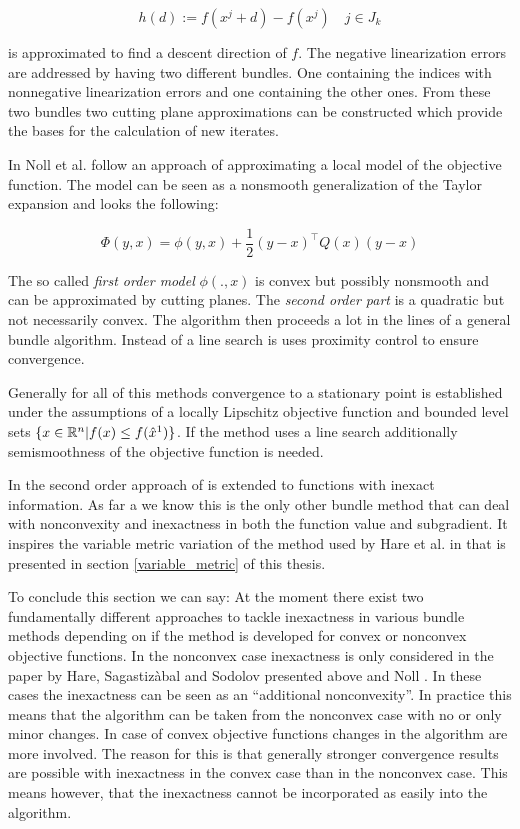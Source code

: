 \begin{equation}
	h(d):= f(x^j +d) -f(x^j) \quad j \in J_k
\label{diff_fun}
\end{equation}

is approximated to find a descent direction of \(f\).
The negative linearization errors are addressed by having two different bundles. One containing the indices with nonnegative linearization errors and one containing the other ones. From these two bundles two cutting plane approximations can be constructed which provide the bases for the calculation of new iterates.

In \cite{Noll2012} Noll et al. follow an approach of approximating a local model of the objective function. The model can be seen as a nonsmooth generalization of the Taylor expansion and looks the following:

\begin{equation}
	\Phi(y,x) = \phi(y,x)+\frac{1}{2}(y-x)^{\top}Q(x)(y-x)
\label{quad_mod}
\end{equation}

The so called \emph{first order model} \(\phi(.,x)\) is convex but possibly nonsmooth and can be approximated by cutting planes. The \emph{second order part} is a quadratic but not necessarily convex. The algorithm then proceeds a lot in the lines of a general bundle algorithm.
Instead of a line search is uses proximity control to ensure convergence.

Generally for all of this methods convergence to a stationary point is established under the assumptions of a locally Lipschitz objective function and bounded level sets \(\{x \in \mathbb{R}^n | f(x) \leq f(\hat{x}^1)\}\).
If the method uses a line search additionally semismoothness of the objective function is needed.

In \cite{Noll2013} the second order approach of \cite{Noll2012} is extended to functions with inexact information.
As far a we know this is the only other bundle method that can deal with nonconvexity and inexactness in both the function value and subgradient. It inspires the variable metric variation of the method used by Hare et al. in \cite{Hare2016} that is presented in section \ref{variable_metric} of this thesis.

To conclude this section we can say: At the moment there exist two fundamentally different approaches to tackle inexactness in various bundle methods depending on if the method is developed 	for convex or nonconvex objective functions.
In the nonconvex case inexactness is only considered in the paper by Hare, Sagastiz{\`{a}}bal and Sodolov \cite{Hare2016} presented above and Noll \cite{Noll2013}. In these cases the inexactness can be seen as an ``additional nonconvexity''. In practice this means that the algorithm can be taken from the nonconvex case with no or only minor changes.
In case of convex objective functions changes in the algorithm are more involved. The reason for this is that generally stronger convergence results are possible with inexactness in the convex case than in the nonconvex case. This means however, that the inexactness cannot be incorporated as easily into the algorithm.
